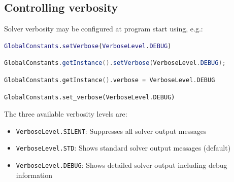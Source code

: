 \subsection{Controlling verbosity}
Solver verbosity may be configured at program start using, e.g.:
\begin{MATLAB}
\begin{lstlisting}[language = matlab]
GlobalConstants.setVerbose(VerboseLevel.DEBUG)
\end{lstlisting}
\end{MATLAB}
\begin{JAVA}
\begin{lstlisting}[language = java, basicstyle=\ttfamily\scriptsize]
GlobalConstants.getInstance().setVerbose(VerboseLevel.DEBUG);
\end{lstlisting}
\end{JAVA}
\begin{KOTLIN}
\begin{lstlisting}[language = kotlin, basicstyle=\ttfamily\scriptsize]
GlobalConstants.getInstance().verbose = VerboseLevel.DEBUG
\end{lstlisting}
\end{KOTLIN}
\begin{PYTHON}
\begin{lstlisting}[language = python]
GlobalConstants.set_verbose(VerboseLevel.DEBUG)
\end{lstlisting}
\end{PYTHON}
\noindent The three available verbosity levels are:
\begin{itemize}
\item \texttt{VerboseLevel.SILENT}: Suppresses all solver output messages
\item \texttt{VerboseLevel.STD}: Shows standard solver output messages (default)
\item \texttt{VerboseLevel.DEBUG}: Shows detailed solver output including debug information
\end{itemize}  

